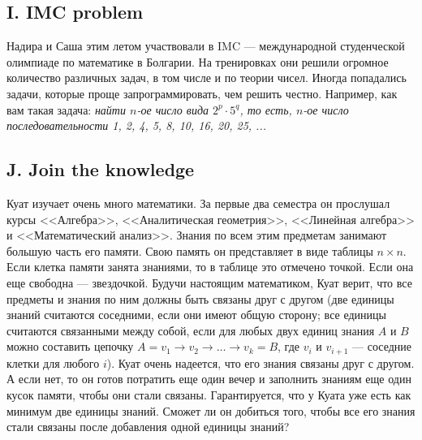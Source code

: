 




\subsection*{I. IMC problem}

Надира и Саша этим летом участвовали в IMC --- международной студенческой олимпиаде по математике в Болгарии. На тренировках они решили огромное количество различных задач, в том числе и по теории чисел. Иногда попадались задачи, которые проще запрограммировать, чем решить честно. Например, как вам такая задача:\newline
\textit{найти $n$-ое число вида $2^p \cdot 5^q$, то есть, $n$-ое число последовательности 1, 2, 4, 5, 8, 10, 16, 20, 25, ...}




\newpage

\subsection*{J. Join the knowledge}

Куат изучает очень много математики. За первые два семестра он прослушал курсы <<Алгебра>>, <<Аналитическая геометрия>>, <<Линейная алгебра>> и <<Математический анализ>>. Знания по всем этим предметам занимают большую часть его памяти. Свою память он представляет в виде таблицы $n \times n$. Если клетка памяти занята знаниями, то в таблице это отмечено точкой. Если она еще свободна --- звездочкой. Будучи настоящим математиком, Куат верит, что все предметы и знания по ним должны быть связаны друг с другом (две единицы знаний считаются соседними, если они имеют общую сторону; все единицы считаются связанными между собой, если для любых двух единиц знания $A$ и $B$ можно составить цепочку $A = v_1 \rightarrow v_2 \rightarrow \dots \rightarrow v_k = B$, где $v_i$ и $v_{i+1}$ --- соседние клетки для любого $i$). Куат очень надеется, что его знания связаны друг с другом. А если нет, то он готов потратить еще один вечер и заполнить знаниям еще один кусок памяти, чтобы они стали связаны. Гарантируется, что у Куата уже есть как минимум две единицы знаний. Сможет ли он добиться того, чтобы все его знания стали связаны после добавления одной единицы знаний?

